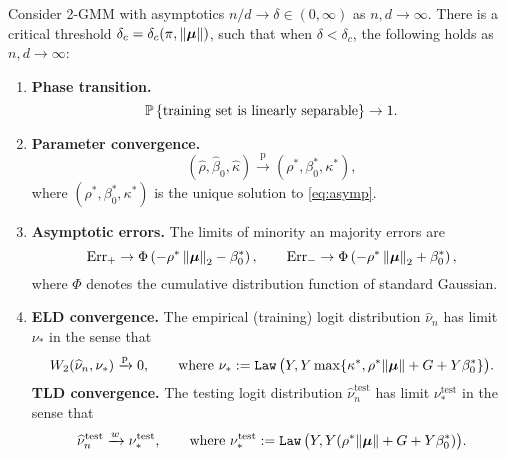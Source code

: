 \begin{thm} \label{thm:SVM}
		Consider 2-GMM with asymptotics $n/d \to \delta \in (0,\infty)$ as $n, d \to \infty$. There is a critical threshold $\delta_c = \delta_c(\pi, \|\bmu\|)$, such that when $\delta < \delta_c$, the following holds as $n, d \to \infty$:
		\begin{enumerate}[label=(\alph*)]
			\item \textbf{Phase transition.} 
                \begin{equation*}
                    \P\left\{ \text{training set is linearly separable} \right\} \to 1.
                \end{equation*}
                
			\item \textbf{Parameter convergence.} 
                \begin{equation*}
                    (\hat \rho, \hat\beta_0, \hat\kappa) \xrightarrow{\mathrm{p}} (\rho^*, \beta_0^*, \kappa^*),
                \end{equation*}
                where $(\rho^*, \beta_0^*, \kappa^*)$ is the unique solution to \cref{eq:asymp}.

                \item 
                \textbf{Asymptotic errors.} The limits of minority an majority errors are
                \begin{equation*}
                    \Err_{+}  \to  \Phi \left(- \rho^* \norm{\bmu}_2 - \beta_0^* \right),
                    \qquad
                    \Err_{-}  \to  \Phi \left(- \rho^* \norm{\bmu}_2  + \beta_0^* \right),
                \end{equation*}
                where $\Phi$ denotes the cumulative distribution function of standard Gaussian.
			\item \label{thm:SVM_c}
            \textbf{ELD convergence.} The empirical (training) logit distribution $\hat{\nu}_n$ has limit $\nu_*$ in the sense that
                \begin{equation*}
                    W_2(\hat{\nu}_n , \nu_* ) \conp 0, \qquad \text{where} ~ 
                    \nu_* := \Law \,\bigl( Y,  Y \max\{\kappa^*, \rho^* \| \bmu \| + G + Y \beta_0^* \} \bigr).
                \end{equation*}
                \textbf{TLD convergence.} The testing logit distribution $\hat{\nu}_n^\mathrm{test}$ has limit $\nu^\mathrm{test}_*$ in the sense that
                \begin{equation*}
                    \hat{\nu}_n^\mathrm{test} \conw \nu^\mathrm{test}_*, \qquad \text{where} ~ 
                    \nu^\mathrm{test}_* := \Law \,\bigl( Y, Y (\rho^* \| \bmu \| + G + Y \beta_0^*) \bigr).
                \end{equation*}
		\end{enumerate}
\end{thm}


